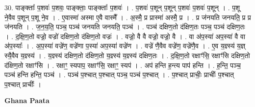 \documentclass[17pt]{extarticle}
\begin{document}
30. पाङ्क्ताः᳚ प॒शवः॑ प॒शवः॒ पाङ्क्ताः॒ पाङ्क्ताः᳚ प॒शवः॑ । . प॒शवः॑ प॒शून् प॒शून् प॒शवः॑ प॒शवः॑ प॒शून् । . प॒शू ने॒वैव प॒शून् प॒शू ने॒व । . ए॒वास्मा॑ अस्मा ए॒वै वास्मै᳚ । . अ॒स्मै॒ प्र प्रास्मा॑ अस्मै॒ प्र । . प्र ज॑नयति जनयति॒ प्र प्र ज॑नयति । . ज॒न॒य॒ति॒ पञ्च॒ पञ्च॑ जनयति जनयति॒ पञ्च॑ । . पञ्च॑ दक्षिण॒तो द॑क्षिण॒तः पञ्च॒ पञ्च॑ दक्षिण॒तः । . द॒क्षि॒ण॒तो वज्रो॒ वज्रो॑ दक्षिण॒तो द॑क्षिण॒तो वज्रः॑ । . वज्रो॒ वै वै वज्रो॒ वज्रो॒ वै । . वा अ॑प॒स्या॑ अप॒स्या॑ वै वा अ॑प॒स्याः᳚ । . अ॒प॒स्या॑ वज्रे॑ण॒ वज्रे॑णा प॒स्या॑ अप॒स्या॑ वज्रे॑ण । . वज्रे॑ णै॒वैव वज्रे॑ण॒ वज्रे॑णै॒व । . ए॒व य॒ज्ञ्स्य॑ य॒ज्ञ् स्यै॒वैव य॒ज्ञ्स्य॑ । . य॒ज्ञ्स्य॑ दक्षिण॒तो द॑क्षिण॒तो य॒ज्ञ्स्य॑ य॒ज्ञ्स्य॑ दक्षिण॒तः । . द॒क्षि॒ण॒तो रक्षाꣳ॑सि॒ रक्षाꣳ॑सि दक्षिण॒तो द॑क्षिण॒तो रक्षाꣳ॑सि । . रक्षाꣳ॒॒ स्यपाप॒ रक्षाꣳ॑सि॒ रक्षाꣳ॒॒ स्यप॑ । . अप॑ हन्ति ह॒न्त्य पाप॑ हन्ति । . ह॒न्ति॒ पञ्च॒ पञ्च॑ हन्ति हन्ति॒ पञ्च॑ । . पञ्च॑ प॒श्चात् प॒श्चात् पञ्च॒ पञ्च॑ प॒श्चात् । . प॒श्चात् प्राचीः॒ प्राचीः᳚ प॒श्चात् प॒श्चात् प्राचीः᳚ । \newline

\textbf{Ghana Paata } \newline
\end{document}
